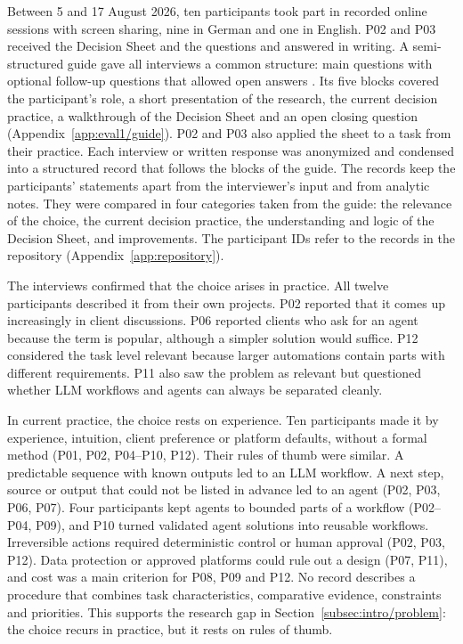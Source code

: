 Between 5 and 17 August 2026, ten participants took part in recorded online sessions with screen sharing, nine in German and one in English. P02 and P03 received the Decision Sheet and the questions and answered in writing. A semi-structured guide gave all interviews a common structure: main questions with optional follow-up questions that allowed open answers \parencite{myersQualitativeInterviewResearch2007}. Its five blocks covered the participant's role, a short presentation of the research, the current decision practice, a walkthrough of the Decision Sheet and an open closing question (Appendix~\ref{app:eval1/guide}). P02 and P03 also applied the sheet to a task from their practice. Each interview or written response was anonymized and condensed into a structured record that follows the blocks of the guide. The records keep the participants' statements apart from the interviewer's input and from analytic notes. They were compared in four categories taken from the guide: the relevance of the choice, the current decision practice, the understanding and logic of the Decision Sheet, and improvements. The participant IDs refer to the records in the repository (Appendix~\ref{app:repository}).

The interviews confirmed that the choice arises in practice. All twelve participants described it from their own projects. P02 reported that it comes up increasingly in client discussions. P06 reported clients who ask for an agent because the term is popular, although a simpler solution would suffice. P12 considered the task level relevant because larger automations contain parts with different requirements. P11 also saw the problem as relevant but questioned whether LLM workflows and agents can always be separated cleanly.

In current practice, the choice rests on experience. Ten participants made it by experience, intuition, client preference or platform defaults, without a formal method (P01, P02, P04--P10, P12). Their rules of thumb were similar. A predictable sequence with known outputs led to an LLM workflow. A next step, source or output that could not be listed in advance led to an agent (P02, P03, P06, P07). Four participants kept agents to bounded parts of a workflow (P02--P04, P09), and P10 turned validated agent solutions into reusable workflows. Irreversible actions required deterministic control or human approval (P02, P03, P12). Data protection or approved platforms could rule out a design (P07, P11), and cost was a main criterion for P08, P09 and P12. No record describes a procedure that combines task characteristics, comparative evidence, constraints and priorities. This supports the research gap in Section~\ref{subsec:intro/problem}: the choice recurs in practice, but it rests on rules of thumb.

